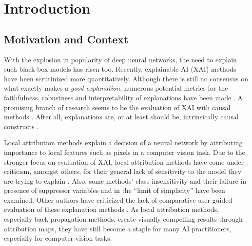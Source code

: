 \chapter{Introduction}\label{chapter:introduction}

\section{Motivation and Context}
With the explosion in popularity of deep neural networks, the need to explain such black-box models has risen too. Recently, explainable AI (XAI) methods have been scrutinized more quantitatively. Although there is still no consensus on what exactly makes a \textit{good explanation}, numerous potential metrics for the faithfulness, robustness and interpretability of explanations have been made \citep{Nauta2023}. A promising branch of research seems to be the evaluation of XAI with causal methods \citep{Moraffah2020a}. After all, explanations are, or at least should be, intrinsically causal constructs \citep{Woodward2004, Halpern2005, Schoelkopf2019}.

Local attribution methods explain a decision of a neural network by attributing importance to local features such as pixels in a computer vision task. 
Due to the stronger focus on evaluation of XAI, local attribution methods have come under criticism, amongst others, for their general lack of sensitivity to the model they are trying to explain \citep{Adebayo2018, Karimi2023}. Also, some methods' class-insensitivity \citep{Sixt2020} and their failure in presence of suppressor variables and in the ``limit of simplicity'' \citep{Wilming2023} have been examined. Other authors have criticized the lack of comparative user-guided evaluation of these explanation methods \citep{Rong2023}. 
As local attribution methods, especially back-propagation methods, create visually compelling results through attribution maps, they have still become a staple for many AI practitioners, especially for computer vision tasks.  

